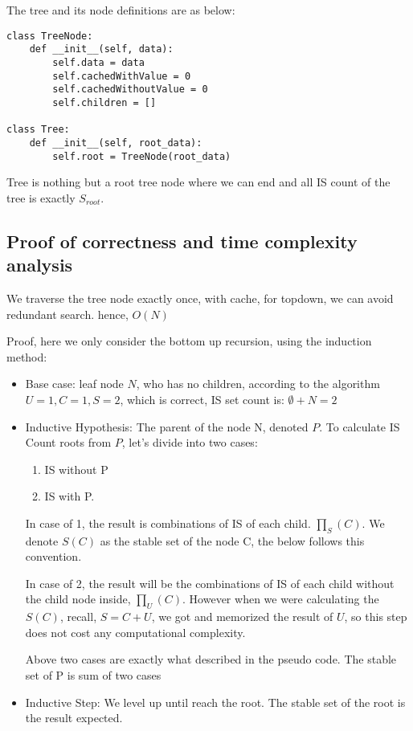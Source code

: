 \documentclass{article}
\begin{document}
The tree and its node definitions are as below:

\begin{lstlisting}
class TreeNode:
    def __init__(self, data):
        self.data = data
        self.cachedWithValue = 0
        self.cachedWithoutValue = 0
        self.children = []

class Tree:
    def __init__(self, root_data):
        self.root = TreeNode(root_data)
\end{lstlisting}

Tree is nothing but a root tree node where we can end and all IS count of the tree is exactly $S_{root}$.

\subsection*{Proof of correctness and time complexity analysis}
We traverse the tree node exactly once, with cache, for topdown, we can avoid redundant search. hence, $O(N)$

Proof, here we only consider the bottom up recursion, using the induction method:
\begin{itemize}
  \item Base case: leaf node $N$, who has no children, according to the algorithm $U=1, C=1, S=2$, which is correct, IS set count is: $\emptyset + N = 2$ 
  \item Inductive Hypothesis: The parent of the node N, denoted $P$. To calculate IS Count roots from $P$, let's divide into two cases: 
    \begin{enumerate}
      \item IS without P
      \item IS with P. 
    \end{enumerate}

    In case of 1, the result is combinations of IS of each child. $\prod_S(C)$. We denote $S(C)$ as the stable set of the node C, the below follows this convention.

    In case of 2, the result will be the combinations of IS of each child without the child node inside, $\prod_U(C)$. However when we were calculating the $S(C)$, recall, $S= C + U$, we got and memorized the result of $U$, so this step does not cost any computational complexity. 

    Above two cases are exactly what described in the pseudo code.
    The stable set of P is sum of two cases
  \item Inductive Step: We level up until reach the root. The stable set of the root is the result expected.
  \end{itemize}
\end{document}
